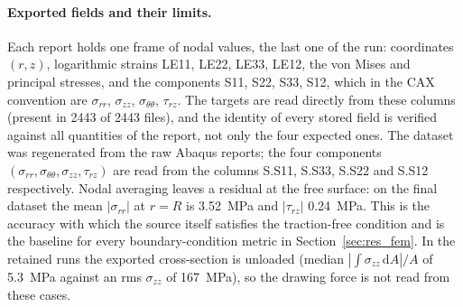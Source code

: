 \paragraph{Exported fields and their limits.}
Each report holds one frame of nodal values, the last one of the run: coordinates $(r,z)$, logarithmic strains LE11, LE22, LE33, LE12, the von Mises and principal stresses, and the components S11, S22, S33, S12, which in the CAX convention are $\sigma_{rr}$, $\sigma_{zz}$, $\sigma_{\theta\theta}$, $\tau_{rz}$. %
The targets are read directly from these columns (present in 2443 of 2443 files), and the identity of every stored field is verified against all quantities of the report, not only the four expected ones. %
The dataset was regenerated from the raw Abaqus reports; the four components $(\sigma_{rr}, \sigma_{\theta\theta}, \sigma_{zz}, \tau_{rz})$ are read from the columns S.S11, S.S33, S.S22 and S.S12 respectively. %
Nodal averaging leaves a residual at the free surface: on the final dataset the mean $|\sigma_{rr}|$ at $r=R$ is 3.52~MPa and $|\tau_{rz}|$ 0.24~MPa. %
This is the accuracy with which the source itself satisfies the traction-free condition and is the baseline for every boundary-condition metric in Section~\ref{sec:res_fem}. %
In the retained runs the exported cross-section is unloaded (median $|\int\sigma_{zz}\,\mathrm{d}A|/A$ of 5.3~MPa against an rms $\sigma_{zz}$ of 167~MPa), so the drawing force is not read from these cases. %

